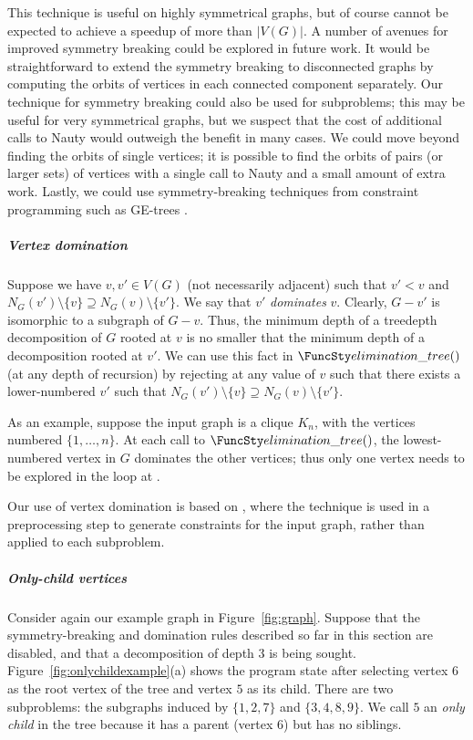 {    This technique is useful on highly symmetrical graphs, but of course cannot
    be expected to achieve a speedup of more than $|V(G)|$.
    A number of avenues for improved symmetry breaking could be explored in future work.
    It would be straightforward
    to extend the symmetry breaking to disconnected graphs by computing the orbits of
    vertices in each connected component separately.  Our technique for symmetry breaking
    could also be used for subproblems; this may be useful
    for very symmetrical graphs, but we suspect that the cost of additional calls to Nauty would outweigh
    the benefit in many cases.   We could move beyond finding the orbits of
    single vertices; it is possible to find the orbits of pairs (or larger sets)
    of vertices with a single call to Nauty and a small amount of extra work.
    Lastly, we could use symmetry-breaking techniques from constraint programming
    such as GE-trees \cite{DBLP:conf/ecai/Roney-DougalGKL04}.

    \subparagraph*{Vertex domination}

    Suppose we have $v, v' \in V(G)$ (not necessarily adjacent) such that $v' < v$ and
    $N_G(v') \setminus \{v\} \supseteq N_G(v) \setminus \{v'\}$.  We say that
    $v'$ \emph{dominates} $v$.  Clearly,
    $G - v'$ is isomorphic to a subgraph of $G - v$.  Thus, the minimum depth of a treedepth
    decomposition of $G$ rooted at $v$ is no smaller that the minimum depth of a
    decomposition rooted at $v'$.  We can use this fact in $\TDConnected()$
    (at any depth of recursion) by rejecting at  any value of $v$ such that there exists
    a lower-numbered $v'$ such that $N_G(v') \setminus \{v\} \supseteq N_G(v) \setminus \{v'\}$.

    As an example, suppose the input graph is a clique $K_n$, with the vertices numbered
    $\{1, \dots, n\}$.  At each call to $\TDConnected()$, the lowest-numbered
    vertex in $G$ dominates the other vertices; thus only one vertex needs to be explored
    in the loop at .

    Our use of vertex domination is based on \cite{DBLP:conf/alenex/GanianLOS19,DBLP:journals/corr/abs-1911-12995}, where
    the technique is used in a preprocessing step to generate constraints for the input graph,
    rather than applied to each subproblem.

    \subparagraph*{Only-child vertices}

    Consider again our example graph in Figure~\ref{fig:graph}.  Suppose that the
    symmetry-breaking and domination rules described so far in this section are disabled, and that
    a decomposition of depth 3 is being sought.  
    Figure~\ref{fig:onlychildexample}(a) shows the program state after selecting vertex
    $6$ as the root vertex of the tree and vertex $5$ as its child.  There are two
    subproblems: the subgraphs induced by $\{1,2,7\}$ and $\{3,4,8,9\}$.  We call $5$
    an \emph{only child} in the tree because it has a parent (vertex $6$) but has no siblings.

}
